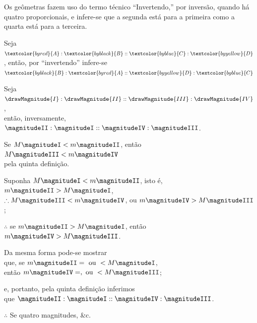 \documentclass[booklanguage=brazilian]{byrnebook}
\begin{document}
\label{def:V.XIV}
\def\varA{\textcolor{byred}{A}}
\def\varB{\textcolor{byblack}{B}}
\def\varC{\textcolor{byblue}{C}}
\def\varD{\textcolor{byyellow}{D}}
Os geômetras fazem uso do termo técnico \enquote{Invertendo,} por inversão, quando há quatro proporcionais, e infere-se que a segunda está para a primeira como a quarta está para a terceira.

Seja $\varA : \varB :: \varC : \varD$, então, por \enquote{invertendo} infere-se $\varB : \varA :: \varD : \varC$

\vfill\pagebreak

\label{prop:V.B} %

\begin{center}
Seja $\drawMagnitude{I} : \drawMagnitude{II} :: \drawMagnitude{III} : \drawMagnitude{IV}$,\\
então, inversamente, $\magnitudeII : \magnitudeI :: \magnitudeIV : \magnitudeIII$.

Se $M \magnitudeI < m \magnitudeII$, então $M \magnitudeIII < m \magnitudeIV$\\
pela quinta definição.

Suponha $M \magnitudeI < m \magnitudeII$, isto é, $m \magnitudeII > M \magnitudeI$,\\
$\therefore M \magnitudeIII < m \magnitudeIV$, ou $m \magnitudeIV > M \magnitudeIII$;

$\therefore$ se $m \magnitudeII > M \magnitudeI$, então $m \magnitudeIV > M \magnitudeIII$.

Da mesma forma pode-se mostrar\\
que, se $m \magnitudeII = \mbox{ ou } < M \magnitudeI$,\\
então $m \magnitudeIV =, \mbox{ ou } < M \magnitudeIII$;

e, portanto, pela quinta definição inferimos\\
que $\magnitudeII : \magnitudeI :: \magnitudeIV : \magnitudeIII$.

$\therefore$ Se quatro magnitudes, \&c.
\end{center}

\vfill\pagebreak
\end{document}
